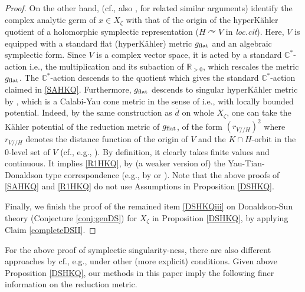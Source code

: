 \documentclass[12pt,a4paper]{amsart}
\theoremstyle{remark}
\theoremstyle{definition}
\def\R{\mathbb{R}}
\def\C{\mathbb{C}}
\begin{document}
\begin{proof}
On the other hand, \cite[Theorems 1.3, 1.4(iv), \S 4.3]{May} 
(cf., also \cite{LSj}, 
\cite[Proposition 4.4]{NakajimaTakayama} for related similar 
arguments) 
identify the complex analytic germ of $x\in X_\zeta$ 
with that of the 
origin of the hyperK\"ahler quotient of a holomorphic symplectic 
representation ($H\curvearrowright V$ in {\it loc.cit}). Here, $V$ is equipped with a 
standard flat (hyperK\"ahler) metric $g_{\rm flat}$ and an algebraic 
symplectic form. 
Since $V$ is a complex 
vector space, it is acted by 
a standard $\C^*$-action i.e., 
the multiplication and its subaction of $\R_{>0}$, 
which rescales the metric $g_{\rm flat}$. 
The $\C^*$-action descends to 
the quotient 
which gives the standard $\C^*$-action 
claimed in \eqref{SAHKQ}. Furthermore,  $g_{\rm flat}$ 
descends to 
singular hyperK\"ahler metric by \cite[\S 3]{HKLR}, 
which is a 
Calabi-Yau cone metric in the sense of 
\cite[around 2.9]{Linotes} i.e., with 
locally bounded potential. Indeed, by the same 
construction as $\overline{d}$ on whole $X_\zeta$, 
one can take the 
K\"ahler potential of the reduction metric of 
$g_{\rm flat}$, of the form $(r_{V//H})^2$ 
where $r_{V//H}$ denotes the distance function of 
the origin of $V$ and the $K\cap H$-orbit in the 
$0$-level set of $V$ (cf., e.g., \cite{MSY2, CS, Od24a}). 
By definition, it clearly takes  finite values and continuous. 
It implies \eqref{R1HKQ}, by (a weaker version of) the Yau-Tian-Donaldson 
type correspondence (e.g., by \cite[1.3 or 1.5]{LX} or 
\cite[Theorem 2.9]{Linotes}). 
Note that the above proofs of \eqref{SAHKQ} and \eqref{R1HKQ} do not use Assumptions in Proposition \ref{DSHKQ}. 

Finally, we finish the proof of the remained item \eqref{DSHKQiii} on 
Donaldson-Sun theory (Conjecture \ref{conj:genDS}) for $X_\zeta$ in 
Proposition \ref{DSHKQ}, by applying Claim \ref{completeDSII}. \end{proof}

For the above 
proof of symplectic singularity-ness, 
there are also different approaches by 
cf., e.g., \cite{BS, HSS, BS2, HSS2} under other (more explicit) conditions. 
Given above Proposition \ref{DSHKQ}, 
our methods in this paper imply the following finer information on 
the reduction metric. 
\end{document}
